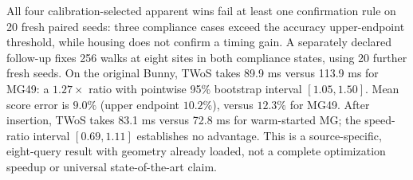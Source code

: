 All four calibration-selected apparent wins fail at least one confirmation
rule on 20 fresh paired seeds: three compliance cases exceed the accuracy
upper-endpoint threshold, while housing does not confirm a timing gain.
A separately declared follow-up fixes 256 walks at eight sites in both
compliance states, using 20 further fresh seeds. On the original Bunny,
TWoS takes 89.9 ms versus 113.9 ms for MG49: a $1.27\times$ ratio with
pointwise 95\% bootstrap interval $[1.05,1.50]$. Mean score error is
$9.0\%$ (upper endpoint $10.2\%$), versus $12.3\%$ for MG49.
After insertion, TWoS takes 83.1 ms versus 72.8 ms for warm-started MG;
the speed-ratio interval $[0.69,1.11]$ establishes no advantage.
This is a source-specific, eight-query result with geometry already loaded,
not a complete optimization speedup or universal state-of-the-art claim.

